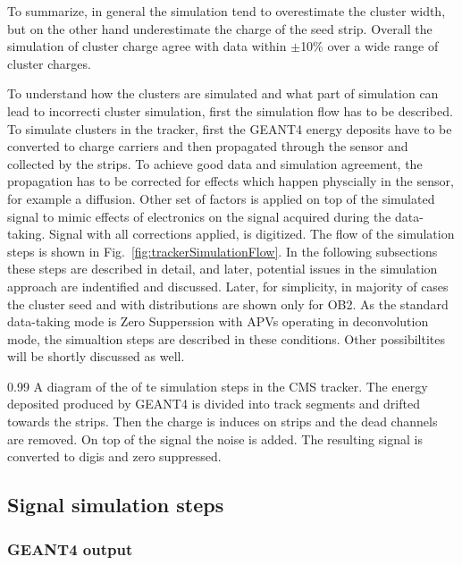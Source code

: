 To summarize, in general the simulation tend to overestimate the cluster width, but on the other hand underestimate the charge of the seed strip. Overall the simulation of cluster charge agree with data within $\pm$10\% over a wide range of cluster charges.  

To understand how the clusters are simulated and what part of simulation can lead to incorrecti cluster simulation, first the simulation flow has to be described. To simulate clusters in the tracker, first the GEANT4 energy deposits have to be converted to charge carriers and then propagated through the sensor and collected by the strips. To achieve good data and simulation agreement, the propagation has to be corrected for effects which happen physcially in the sensor, for example a diffusion. Other set of factors is applied on top of the simulated signal to mimic effects of electronics on the signal acquired during the data-taking. Signal with all corrections applied, is digitized. The flow of the simulation steps is shown in Fig.~\ref{fig:trackerSimulationFlow}. In the following subsections these steps are described in detail, and later, potential issues in the simulation approach are indentified and discussed. Later, for simplicity, in majority of cases the cluster seed and with distributions are shown only for OB2. As the standard data-taking mode is Zero Supperssion with APVs operating in deconvolution mode, the simualtion steps are described in these conditions. Other possibiltites will be shortly discussed as well.

                 {0.99}       %
                 { A diagram of the of te simulation steps in the CMS tracker. The energy deposited produced by GEANT4 is divided into track segments and drifted towards the strips. Then the charge is induces on strips and the dead channels are removed. On top of the signal the noise is added. The resulting signal is converted to digis and zero suppressed. }

\subsection{Signal simulation steps}


\subsubsection{GEANT4 output}

